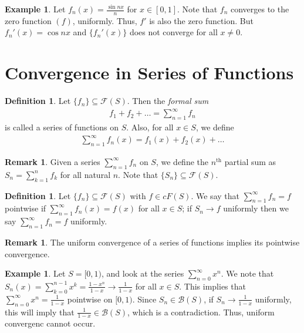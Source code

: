 \documentclass[15pt,a4paper]{book}
\theoremstyle{definition}
\newtheorem{definition}[theorem]{Definition}
\newtheorem{example}[theorem]{Example}
\newtheorem{remark}[theorem]{Remark}
\newcommand{\eax}[1]{\emph{#1}\index{#1}} %
\newcommand{\cB}{\mathcal{B}}
\newcommand{\cF}{\mathcal{F}}
\begin{document}
\begin{example}
    Let $f_{n}(x) = \frac{\sin nx}{n}$ for $x \in [0,1]$. Note that $f_{n}$ converges to the zero function $(f)$, uniformly. Thus, $f'$ is also the zero function. But $f_{n}'(x) = \cos nx$ and $\{f_{n}'(x)\}$ does not converge for all $x \neq 0$.
\end{example}

\section{Convergence in Series of Functions}
\begin{definition}
    Let $\{f_{n}\} \subseteq \cF(S)$. Then the \eax{formal sum}
    \begin{align*}
        f_{1} + f_{2} + \ldots = \sum_{n=1}^{\infty} f_{n}
    \end{align*}
    is called a series of functions on $S$. Also, for all $x \in S$, we define
    \begin{align*}
        \sum_{n=1}^{\infty} f_{n}(x) = f_{1}(x) + f_{2}(x) + \ldots
    \end{align*}
\end{definition}

\begin{remark}
    Given a series $\sum_{n=1}^{\infty} f_{n}$ on $S$, we define the $n^{\text{th}}$ partial sum as $S_{n} = \sum_{k=1}^{n} f_{k}$ for all natural $n$. Note that $\{S_{n}\} \subseteq \cF(S)$.
\end{remark}

\begin{definition}
    Let $\{f_{n}\} \subseteq \cF(S)$ with $f \in cF(S)$. We say that $\sum_{n=1}^{\infty} f_{n} = f$ pointwise if $\sum_{n=1}^{\infty} f_{n}(x) = f(x)$ for all $x \in S$; if $S_{n} \to f$ uniformly then we say $\sum_{n=1}^{\infty} f_{n} = f$ uniformly.
\end{definition}
\begin{remark}
    The uniform convergence of a series of functions implies its pointwise convergence.
\end{remark}

\begin{example}
    Let $S = [0,1)$, and look at the series $\sum_{n=0}^{\infty} x^{n}$. We note that $S_{n}(x) = \sum_{k=0}^{n-1} x^{k} = \frac{1-x^{n}}{1-x} \to \frac{1}{1-x}$ for all $x \in S$. This implies that $\sum_{n=0}^{\infty} x^{n} = \frac{1}{1-x}$ pointwise on $[0,1)$. Since $S_{n} \in \cB(S)$, if $S_{n} \to \frac{1}{1-x}$ uniformly, this will imply that $\frac{1}{1-x} \in \cB(S)$, which is a contradiction. Thus, uniform convergenc cannot occur.
\end{example}
\end{document}
